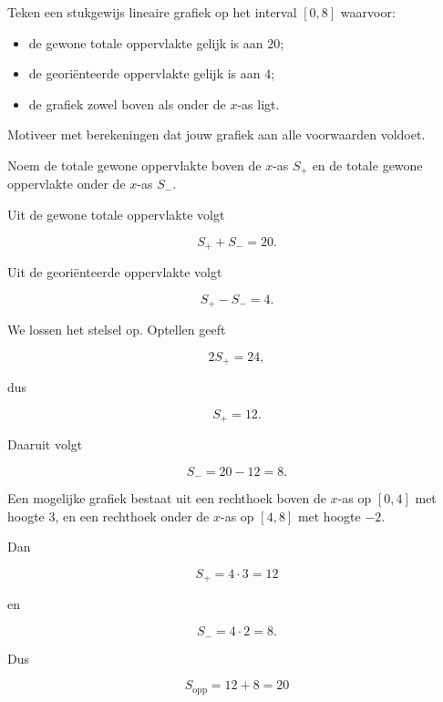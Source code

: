 \documentclass{ximera}
\begin{document}





\begin{oefening}{\oefG}

Teken een stukgewijs lineaire grafiek op het interval \([0,8]\) waarvoor:

\begin{itemize}
    \item de gewone totale oppervlakte gelijk is aan \(20\);
    \item de georiënteerde oppervlakte gelijk is aan \(4\);
    \item de grafiek zowel boven als onder de \(x\)-as ligt.
\end{itemize}

Motiveer met berekeningen dat jouw grafiek aan alle voorwaarden voldoet.

\begin{oplossing}

Noem de totale gewone oppervlakte boven de \(x\)-as \(S_+\) en de totale
gewone oppervlakte onder de \(x\)-as \(S_-\).

Uit de gewone totale oppervlakte volgt

\[
S_+ + S_-=20.
\]

Uit de georiënteerde oppervlakte volgt

\[
S_+-S_-=4.
\]

We lossen het stelsel op. Optellen geeft

\[
2S_+=24,
\]

dus

\[
S_+=12.
\]

Daaruit volgt

\[
S_-=20-12=8.
\]

Een mogelijke grafiek bestaat uit een rechthoek boven de \(x\)-as op
\([0,4]\) met hoogte \(3\), en een rechthoek onder de \(x\)-as op
\([4,8]\) met hoogte \(-2\).

Dan

\[
S_+=4\cdot3=12
\]

en

\[
S_-=4\cdot2=8.
\]

Dus

\[
S_{\mathrm{opp}}=12+8=20
\]


\end{oplossing}
\end{oefening}
\end{document}
